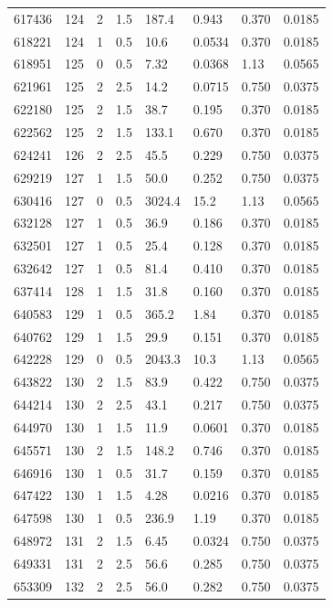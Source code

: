 \documentclass[preview]{standalone}
\begin{document}
{{{{{{{{\begin{tabular}{L{1.2cm}C{1.2cm} C{0.3cm}C{0.5cm} C{1.4cm}C{1.4cm} C{1.4cm}C{1.4cm}}
  617436  &   124  & 2     & 1.5 &  187.4  & 0.943  & 0.370 &  0.0185   \\ 
  618221  &   124  & 1     & 0.5 &  10.6  & 0.0534  & 0.370 &  0.0185   \\ 
  618951  &   125  & 0     & 0.5 &  7.32  & 0.0368  & 1.13 &  0.0565   \\ 
  621961  &   125  & 2     & 2.5 &  14.2  & 0.0715  & 0.750 &  0.0375   \\ 
  622180  &   125  & 2     & 1.5 &  38.7  & 0.195  & 0.370 &  0.0185   \\ 
  622562  &   125  & 2     & 1.5 &  133.1  & 0.670  & 0.370 &  0.0185   \\ 
  624241  &   126  & 2     & 2.5 &  45.5  & 0.229  & 0.750 &  0.0375   \\ 
  629219  &   127  & 1     & 1.5 &  50.0  & 0.252  & 0.750 &  0.0375   \\ 
  630416  &   127  & 0     & 0.5 &  3024.4  & 15.2  & 1.13 &  0.0565   \\ 
  632128  &   127  & 1     & 0.5 &  36.9  & 0.186  & 0.370 &  0.0185   \\ 
  632501  &   127  & 1     & 0.5 &  25.4  & 0.128  & 0.370 &  0.0185   \\ 
  632642  &   127  & 1     & 0.5 &  81.4  & 0.410  & 0.370 &  0.0185   \\ 
  637414  &   128  & 1     & 1.5 &  31.8  & 0.160  & 0.370 &  0.0185   \\ 
  640583  &   129  & 1     & 0.5 &  365.2  & 1.84  & 0.370 &  0.0185   \\ 
  640762  &   129  & 1     & 1.5 &  29.9  & 0.151  & 0.370 &  0.0185   \\ 
  642228  &   129  & 0     & 0.5 &  2043.3  & 10.3  & 1.13 &  0.0565   \\ 
  643822  &   130  & 2     & 1.5 &  83.9  & 0.422  & 0.750 &  0.0375   \\ 
  644214  &   130  & 2     & 2.5 &  43.1  & 0.217  & 0.750 &  0.0375   \\ 
  644970  &   130  & 1     & 1.5 &  11.9  & 0.0601  & 0.370 &  0.0185   \\ 
  645571  &   130  & 2     & 1.5 &  148.2  & 0.746  & 0.370 &  0.0185   \\ 
  646916  &   130  & 1     & 0.5 &  31.7  & 0.159  & 0.370 &  0.0185   \\ 
  647422  &   130  & 1     & 1.5 &  4.28  & 0.0216  & 0.370 &  0.0185   \\ 
  647598  &   130  & 1     & 0.5 &  236.9  & 1.19  & 0.370 &  0.0185   \\ 
  648972  &   131  & 2     & 1.5 &  6.45  & 0.0324  & 0.750 &  0.0375   \\ 
  649331  &   131  & 2     & 2.5 &  56.6  & 0.285  & 0.750 &  0.0375   \\ 
  653309  &   132  & 2     & 2.5 &  56.0  & 0.282  & 0.750 &  0.0375   \\ 
\hline 
\end{tabular} 

}}}}}}}}
\end{document}
